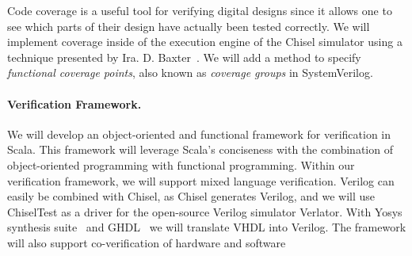 \documentclass[fleqn,12pt]{article}
\begin{document}
Code coverage is a useful tool for verifying digital designs
since it allows one to see which parts of their design have actually been tested correctly. 
We will implement coverage inside of the execution engine of the Chisel simulator using a technique
presented by Ira. D. Baxter~\cite{branch-cov-made-easy:2002}.
We will add a method to specify \textit{functional coverage points}, also known as
\textit{coverage groups} in SystemVerilog.



%


\paragraph{Verification Framework.}

We will develop an object-oriented and functional framework for verification in Scala.
This framework will leverage Scala's conciseness with the
combination of object-oriented programming with functional programming.
Within our verification framework, we will support mixed language verification.
Verilog can easily be combined with Chisel, as Chisel generates Verilog, and
we will use ChiselTest as a driver for the open-source Verilog simulator Verlator.
With Yosys synthesis suite~\cite{Yosys} and GHDL~\cite{ghdl}
we will translate VHDL into Verilog.
The framework will also support co-verification of hardware and software
\end{document}
